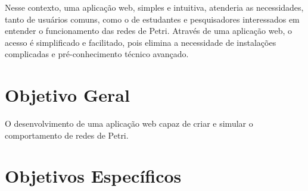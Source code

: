\documentclass[
	12pt,				%
	openright,			%
	oneside,			%
	a4paper,			%
	english,			%
	brazil				%
	]{abntex2}
\begin{document}
Nesse contexto, uma aplicação web, simples e intuitiva, atenderia as necessidades, tanto de usuários comuns, como o de estudantes e pesquisadores interessados em entender o funcionamento das redes de Petri. Através de uma aplicação web, o acesso é simplificado e facilitado, pois elimina a necessidade de instalações complicadas e pré-conhecimento técnico avançado.








\section{Objetivo Geral}

O desenvolvimento de uma aplicação web capaz de criar e simular o comportamento de redes de Petri.

\section{Objetivos Específicos} \label{cap:objEspecifico}
\end{document}
